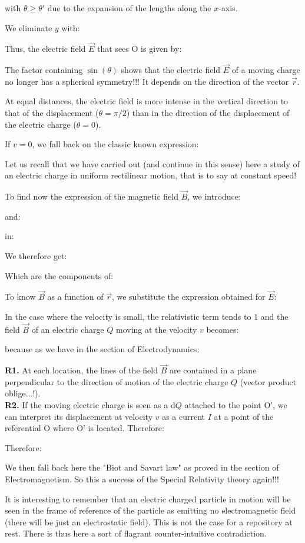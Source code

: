 	with $\theta\geq \theta'$ due to the expansion of the lengths along the $x$-axis.

	We eliminate $y$ with:
	
	Thus, the electric field $\vec{E}$ that sees O is given by:
	
	The factor containing $\sin(\theta)$ shows that the electric field $\vec{E}$ of a moving charge no longer has a spherical symmetry!!! It depends on the direction of the vector $\vec{r}$.

	At equal distances, the electric field is more intense in the vertical direction to that of the displacement ($\theta=\pi/2$) than in the direction of the displacement of the electric charge ($\theta=0$).

	If $v = 0$, we fall back on the classic known expression:
	
	\begin{tcolorbox}[title=Remark,colframe=black,arc=10pt]
	Let us recall that we have carried out (and continue in this sense) here a study of an electric charge in uniform rectilinear motion, that is to say at constant speed!
	\end{tcolorbox}
	To find now the expression of the magnetic field $\vec{B}$, we introduce:
	
	and:
	
	in:
	
	We therefore get:
	
	Which are the components of:
	
	To know $\vec{B}$ as a function of $\vec{r}$, we substitute the expression obtained for $\vec{E}$:
	
	In the case where the velocity is small, the relativistic term tends to $1$ and the field $\vec{B}$ of an electric charge $Q$ moving at the velocity $v$ becomes:
	
	because as we have in the section of Electrodynamics: 
	
	\begin{tcolorbox}[title=Remarks,colframe=black,arc=10pt]
	\textbf{R1.} At each location, the lines of the field $\vec{B}$ are contained in a plane perpendicular to the direction of motion of the electric charge $Q$ (vector product oblige...!).\\
	
	\textbf{R2.} If the moving electric charge is seen as a $\mathrm{d}Q$ attached to the point O', we can interpret its displacement at velocity $v$ as a current $I$ at a point of the referential O where O' is located. Therefore:
	
	Therefore:
	
	We then fall back here the "Biot and Savart law" as proved in the section of Electromagnetism. So this a success of the Special Relativity theory again!!!
	\end{tcolorbox}
	It is interesting to remember that an electric charged particle in motion will be seen in the frame of reference of the particle as emitting no electromagnetic field (there will be just an electrostatic field). This is not the case for a repository at rest. There is thus here a sort of flagrant counter-intuitive contradiction.

